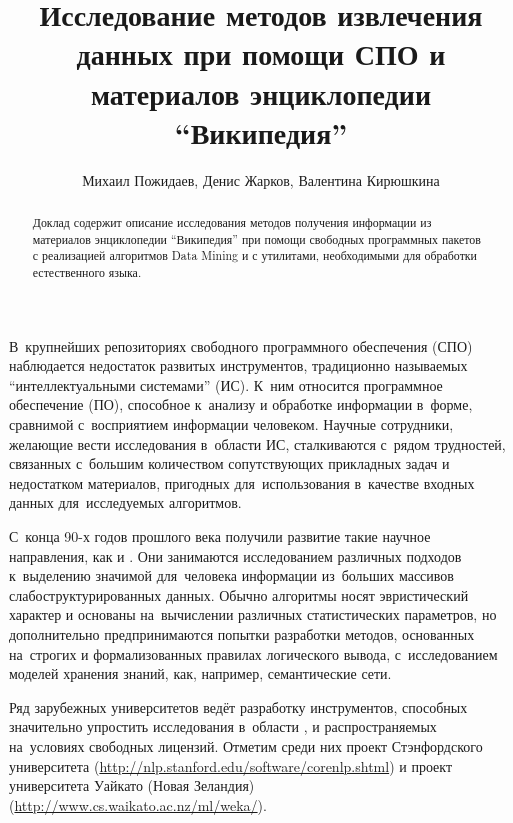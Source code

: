 \author{Михаил Пожидаев, Денис Жарков, Валентина Кирюшкина}




\title{Исследование методов извлечения данных при помощи СПО и материалов энциклопедии ``Википедия''}

\maketitle

\begin{abstract}

Доклад содержит описание исследования методов получения информации из
материалов энциклопедии ``Википедия'' при помощи свободных программных
пакетов с реализацией алгоритмов Data Mining и с утилитами,
необходимыми для обработки естественного языка.

\end{abstract}

В~крупнейших репозиториях свободного программного обеспечения (СПО) наблюдается недостаток развитых инструментов, традиционно называемых ``интеллектуальными системами'' (ИС).
К~ним относится программное обеспечение (ПО),
способное к~анализу и обработке информации в~форме, 
сравнимой с~восприятием информации человеком.
Научные сотрудники, желающие  вести исследования в~области ИС, сталкиваются с~рядом трудностей,
связанных с~большим количеством сопутствующих прикладных задач и недостатком материалов,
пригодных для~использования в~качестве входных данных для~исследуемых алгоритмов.

С~конца 90-х годов прошлого века получили развитие такие научное направления, как  и .
Они занимаются исследованием различных подходов к~выделению значимой для~человека информации из~больших массивов  слабоструктурированных данных.
Обычно алгоритмы  носят эвристический характер и основаны на~вычислении различных статистических параметров,
но дополнительно предпринимаются  попытки разработки методов, основанных на~строгих и формализованных правилах логического вывода,
с~исследованием моделей хранения знаний, как, например, семантические сети.

Ряд зарубежных университетов ведёт разработку инструментов, способных значительно упростить исследования в~области ,
и распространяемых на~условиях свободных лицензий.
Отметим среди них проект  Стэнфордского университета 
(\url{http://nlp.stanford.edu/software/corenlp.shtml})
и проект  университета Уайкато (Новая Зеландия)
(\url{http://www.cs.waikato.ac.nz/ml/weka/}).

